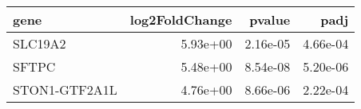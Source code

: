 \begin{tabular}{lrrr}
\toprule
         gene &  log2FoldChange &   pvalue &     padj \\
\midrule
      SLC19A2 &        5.93e+00 & 2.16e-05 & 4.66e-04 \\
        SFTPC &        5.48e+00 & 8.54e-08 & 5.20e-06 \\
STON1-GTF2A1L &        4.76e+00 & 8.66e-06 & 2.22e-04 \\
\bottomrule
\end{tabular}
